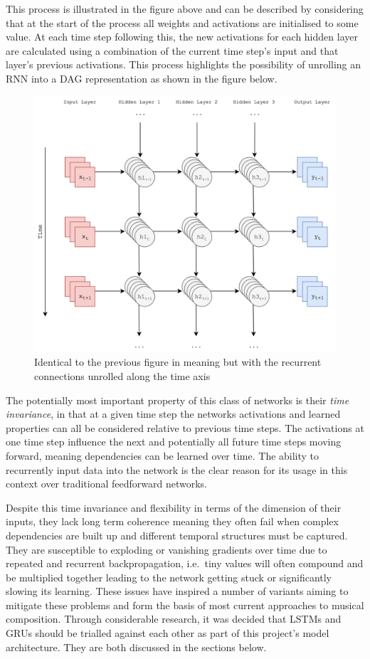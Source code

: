 \documentclass[12pt,]{article}
\begin{document}
This process is illustrated in the figure above and can be described by
considering that at the start of the process all weights and activations
are initialised to some value. At each time step following this, the new
activations for each hidden layer are calculated using a combination of
the current time step's input and that layer's previous activations.
This process highlights the possibility of unrolling an RNN into a DAG
representation as shown in the figure below.

\begin{figure}
\centering
\includegraphics{Images/unrolledrnn.png}
\caption{Identical to the previous figure in meaning but with the
recurrent connections unrolled along the time axis}
\end{figure}

The potentially most important property of this class of networks is
their \emph{time invariance}, in that at a given time step the networks
activations and learned properties can all be considered relative to
previous time steps. The activations at one time step influence the next
and potentially all future time steps moving forward, meaning
dependencies can be learned over time. The ability to recurrently input
data into the network is the clear reason for its usage in this context
over traditional feedforward networks.

Despite this time invariance and flexibility in terms of the dimension
of their inputs, they lack long term coherence meaning they often fail
when complex dependencies are built up and different temporal structures
must be captured. They are susceptible to exploding or vanishing
gradients over time due to repeated and recurrent backpropagation,
i.e.~tiny values will often compound and be multiplied together leading
to the network getting stuck or significantly slowing its learning.
These issues have inspired a number of variants aiming to mitigate these
problems and form the basis of most current approaches to musical
composition. Through considerable research, it was decided that LSTMs
and GRUs should be trialled against each other as part of this project's
model architecture. They are both discussed in the sections below.
\end{document}
